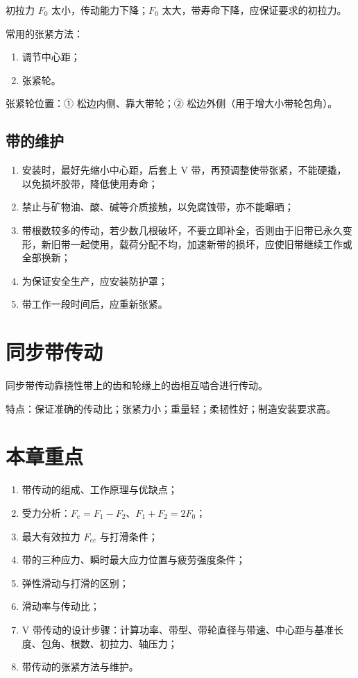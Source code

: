初拉力 $F_0$ 太小，传动能力下降；$F_0$ 太大，带寿命下降，应保证要求的初拉力。

常用的张紧方法：
\begin{enumerate}
	\item 调节中心距；
	\item 张紧轮。
\end{enumerate}

张紧轮位置：① 松边内侧、靠大带轮；② 松边外侧（用于增大小带轮包角）。

\subsection{带的维护}
\label{sec:带传动:维护}

\begin{enumerate}
	\item 安装时，最好先缩小中心距，后套上 V 带，再预调整使带张紧，不能硬撬，以免损坏胶带，降低使用寿命；
	\item 禁止与矿物油、酸、碱等介质接触，以免腐蚀带，亦不能曝晒；
	\item 带根数较多的传动，若少数几根破坏，不要立即补全，否则由于旧带已永久变形，新旧带一起使用，载荷分配不均，加速新带的损坏，应使旧带继续工作或全部换新；
	\item 为保证安全生产，应安装防护罩；
	\item 带工作一段时间后，应重新张紧。
\end{enumerate}

\section{同步带传动}
\label{sec:带传动:同步带}

同步带传动靠挠性带上的齿和轮缘上的齿相互啮合进行传动。

特点：保证准确的传动比；张紧力小；重量轻；柔韧性好；制造安装要求高。

\section*{本章重点}

\begin{enumerate}
	\item 带传动的组成、工作原理与优缺点；
	\item 受力分析：$F_e=F_1-F_2$、$F_1+F_2=2F_0$；
	\item 最大有效拉力 $F_{ec}$ 与打滑条件；
	\item 带的三种应力、瞬时最大应力位置与疲劳强度条件；
	\item 弹性滑动与打滑的区别；
	\item 滑动率与传动比；
	\item V 带传动的设计步骤：计算功率、带型、带轮直径与带速、中心距与基准长度、包角、根数、初拉力、轴压力；
	\item 带传动的张紧方法与维护。
\end{enumerate}
